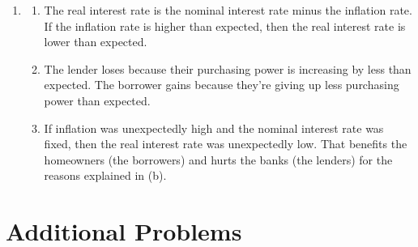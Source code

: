 \documentclass{article}
\begin{document}
\begin{enumerate}
\begin{enumerate}
	\end{enumerate}
	
\item

	\begin{enumerate}
	
	\item The real interest rate is the nominal interest rate minus the inflation rate. If the inflation rate is higher than expected, then the real interest rate is lower than expected.
	
	\item The lender loses because their purchasing power is increasing by less than expected. The borrower gains because they're giving up less purchasing power than expected.
	
	\item If inflation was unexpectedly high and the nominal interest rate was fixed, then the real interest rate was unexpectedly low. That benefits the homeowners (the borrowers) and hurts the banks (the lenders) for the reasons explained in (b).
	
	\end{enumerate}

\end{enumerate}

\section*{Additional Problems}
\end{document}
